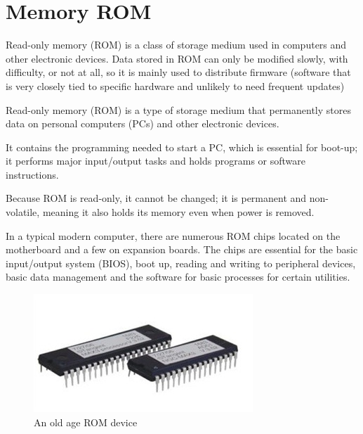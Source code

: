 \documentclass[11pt,a4paper,twoside]{article}
\begin{document}
\section{Memory ROM}
Read-only memory (ROM) is a class of storage medium used in computers and other electronic devices. Data stored in ROM can only be modified slowly, with difficulty, or not at all, so it is mainly used to distribute firmware (software that is very closely tied to specific hardware and unlikely to need frequent updates)\par
Read-only memory (ROM) is a type of storage medium that permanently stores data on personal computers (PCs) and other electronic devices.\par
It contains the programming needed to start a PC, which is essential for boot-up; it performs major input/output tasks and holds programs or software instructions.\par 
Because ROM is read-only, it cannot be changed; it is permanent and non-volatile, meaning it also holds its memory even when power is removed.\par
In a typical modern computer, there are numerous ROM chips located on the motherboard and a few on expansion boards. The chips are essential for the basic input/output system (BIOS), boot up, reading and writing to peripheral devices, basic data management and the software for basic processes for certain utilities.\begin{figure}[H]
\centering \includegraphics[scale=1]{Fig 11.jpg}
\caption{An old age ROM device}
\end{figure}
\end{document}
